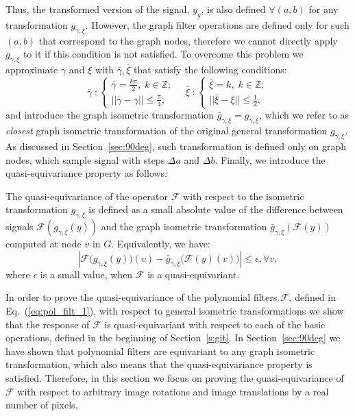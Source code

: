 \documentclass[10pt,journal,compsoc]{IEEEtran}
\newcommand{\mF}{\mathcal{F}}
\begin{document}
	Thus, the transformed version of the signal, $y_g$, is also defined $\forall (a,b)$ for any transformation $g_{\gamma,\xi}$. However, the graph filter operations are defined only for such $(a,b)$ that correspond to the graph nodes, therefore we cannot directly apply $g_{\gamma,\xi}$ to it if this condition is not satisfied. To overcome this problem we approximate $\gamma$ and $\xi$ with $\bar{\gamma}, \bar{\xi}$ that satisfy the following conditions:
	\begin{equation}
	\bar{\gamma} \; :
	\begin{cases}
	\bar{\gamma} = \frac{k\pi}{2},\; k \in \mathbb{Z}; \\
	||\bar{\gamma} - \gamma || \leq \frac{\pi}{4},
	\end{cases} \quad
	\bar{\xi} \; :
	\begin{cases}
	\bar{\xi} = k,\; k \in \mathbb{Z}; \\
	||\bar{\xi} - \xi || \leq \frac{1}{2},
	\end{cases}
	\end{equation}
	\noindent
	and introduce the graph isometric transformation $\bar{g}_{\gamma, \xi} = g_{\bar{\gamma}, \bar{\xi}}$, which we refer to as \emph{closest} graph isometric transformation of the original general transformation $g_{\gamma, \xi}$.
	As discussed in Section~\ref{sec:90deg}, such transformation is defined only on graph nodes, which sample signal with steps $\Delta a$ and $\Delta b$. Finally, we introduce the quasi-equivariance property  as follows:
	\begin{mydef}
		The quasi-equivariance of the operator $\mF$ with respect to the isometric transformation $g_{\gamma,\xi}$ is defined as a small absolute value of the difference between signals $\mathcal{F}(g_{\gamma,\xi} (y))$ and the graph isometric transformation $\bar{g}_{\gamma,\xi}(\mathcal{F}(y))$ computed at node $v$ in $G$. Equivalently, we have:
		\begin{equation}
		\left| \mathcal{F}\big(g_{\gamma,\xi} (y)\big)(v) - \bar{g}_{\gamma,\xi} \big(\mathcal{F}(y)(v)\big) \right|  \leq \epsilon, \forall v,
		\label{eq:equivariance_ref}
		\end{equation}
		\noindent
		where $\epsilon$ is a small value, when $\mathcal{F}$ is a quasi-equivariant.
	\end{mydef}



In order to prove the quasi-equivariance of the polynomial filters $\mathcal{F}$, defined in  Eq.~(\ref{eq:pol_filt_1}), with respect to general isometric transformations we show that the response of $\mathcal{F}$ is quasi-equivariant with respect to each of the basic operations, defined in the beginning of Section~\ref{s:git}. In Section~\ref{sec:90deg} we have shown that polynomial filters are equivariant to any graph isometric transformation, which also means that the quasi-equivariance property is satisfied. Therefore, in this section we focus on proving the quasi-equivariance of $\mathcal{F}$ with respect to arbitrary image rotations and image translations by a real number of pixels.
\end{document}
